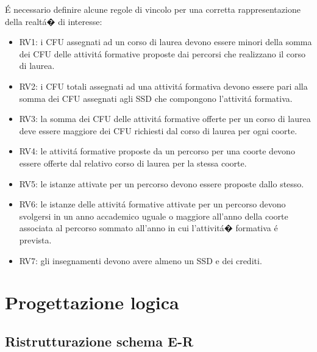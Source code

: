 \documentclass[a4paper,12pt,italian,towside]{article}
\begin{document}
\'E necessario definire alcune regole di vincolo per una corretta rappresentazione della realt\'a� di interesse:
\begin{itemize}
	\item RV1: i CFU assegnati ad un corso di laurea devono essere minori della somma dei CFU delle attivit\'a formative proposte dai percorsi che realizzano il corso di laurea.
	\item RV2: i CFU totali assegnati ad una attivit\'a formativa devono essere pari alla somma dei CFU assegnati agli SSD che compongono l'attivit\'a formativa.
	\item RV3: la somma dei CFU delle attivit\'a formative offerte per un corso di laurea deve essere maggiore dei CFU richiesti dal corso di laurea per ogni coorte.
	\item RV4: le attivit\'a formative proposte da un percorso per una coorte devono essere offerte dal relativo corso di laurea per la stessa coorte.
	\item RV5: le istanze attivate per un percorso devono essere proposte dallo stesso. 
	\item RV6: le istanze delle attivit\'a formative attivate per un percorso devono svolgersi in un anno accademico uguale o maggiore all'anno della coorte associata al percorso sommato all'anno in cui l'attivit\'a� formativa \'e prevista.
	\item RV7: gli insegnamenti devono avere almeno un SSD e dei crediti.
\end{itemize}

\newpage
\section{Progettazione logica}

\subsection{Ristrutturazione schema E-R}
\end{document}
